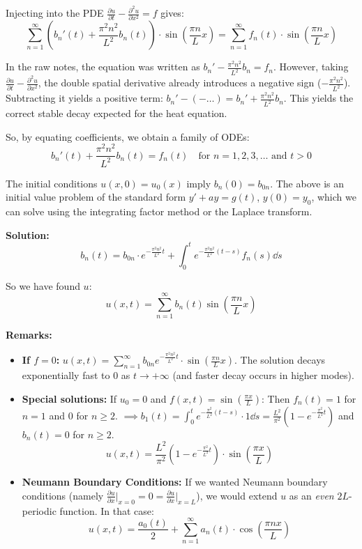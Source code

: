 Injecting into the PDE $\frac{\partial u}{\partial t} - \frac{\partial^2 u}{\partial x^2} = f$ gives:
$$\sum_{n=1}^\infty \left( b_n'(t) + \frac{\pi^2 n^2}{L^2} b_n(t) \right) \cdot \sin\left(\frac{\pi n}{L} x\right) = \sum_{n=1}^\infty f_n(t) \cdot \sin\left(\frac{\pi n}{L} x\right)$$

\begin{verification}
In the raw notes, the equation was written as $b_n' - \frac{\pi^2 n^2}{L^2} b_n = f_n$. However, taking $\frac{\partial u}{\partial t} - \frac{\partial^2 u}{\partial x^2}$, the double spatial derivative already introduces a negative sign ($-\frac{\pi^2 n^2}{L^2}$). Subtracting it yields a positive term: $b_n' - (-\dots) = b_n' + \frac{\pi^2 n^2}{L^2} b_n$. This yields the correct stable decay expected for the heat equation.
\end{verification}

So, by equating coefficients, we obtain a family of ODEs:
$$b_n'(t) + \frac{\pi^2 n^2}{L^2} b_n(t) = f_n(t) \quad \text{for } n=1,2,3,\dots \text{ and } t > 0$$

The initial conditions $u(x,0) = u_0(x)$ imply $b_n(0) = b_{0n}$.
The above is an initial value problem of the standard form $y' + ay = g(t)$, $y(0) = y_0$, which we can solve using the integrating factor method or the Laplace transform.

\textbf{Solution:}
$$b_n(t) = b_{0n} \cdot e^{-\frac{\pi^2 n^2}{L^2} t} + \int_0^t e^{-\frac{\pi^2 n^2}{L^2} (t-s)} f_n(s) \dd s$$

So we have found $u$:
$$u(x,t) = \sum_{n=1}^\infty b_n(t) \sin\left(\frac{\pi n}{L} x\right)$$

\textbf{Remarks:}
\begin{itemize}
    \item \textbf{If $f=0$:} $u(x,t) = \sum_{n=1}^\infty b_{0n} e^{-\frac{\pi^2 n^2}{L^2} t} \cdot \sin\left(\frac{\pi n}{L} x\right)$. 
    The solution decays exponentially fast to 0 as $t \rightarrow +\infty$ (and faster decay occurs in higher modes).
    
    \item \textbf{Special solutions:} If $u_0 = 0$ and $f(x,t) = \sin(\frac{\pi x}{L})$:
    Then $f_n(t) = 1$ for $n=1$ and $0$ for $n \ge 2$.
    $\implies b_1(t) = \int_0^t e^{-\frac{\pi^2}{L^2}(t-s)} \cdot 1 \dd s = \frac{L^2}{\pi^2} \left(1 - e^{-\frac{\pi^2}{L^2} t}\right)$ and $b_n(t) = 0$ for $n \ge 2$.
    $$u(x,t) = \frac{L^2}{\pi^2} \left(1 - e^{-\frac{\pi^2}{L^2} t}\right) \cdot \sin\left(\frac{\pi x}{L}\right)$$
    
    \item \textbf{Neumann Boundary Conditions:}
    If we wanted Neumann boundary conditions (namely $\frac{\partial u}{\partial x}\big|_{x=0} = 0 = \frac{\partial u}{\partial x}\big|_{x=L}$), we would extend $u$ as an \textit{even} $2L$-periodic function. In that case:
    $$u(x,t) = \frac{a_0(t)}{2} + \sum_{n=1}^\infty a_n(t) \cdot \cos\left(\frac{\pi n x}{L}\right)$$
\end{itemize}